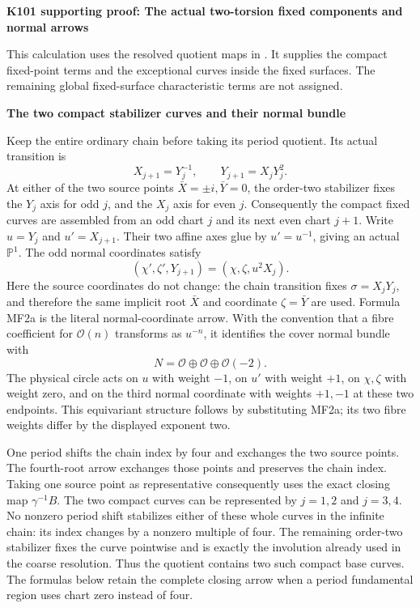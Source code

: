 \par\bigskip\noindent\textbf{K101 supporting proof: The actual two-torsion fixed components and normal arrows}\par\nobreak
This calculation uses the resolved quotient maps in
. It supplies the compact
fixed-point terms and the exceptional curves inside the fixed surfaces.
The remaining global fixed-surface characteristic terms are not assigned.

\par

\medskip\noindent\textbf{The two compact stabilizer curves and their normal bundle}

\par\nobreak

Keep the entire ordinary chain before taking its period quotient. Its
actual transition is
\[
 X_{j+1}=Y_j^{-1},\qquad Y_{j+1}=X_jY_j^2.
\]
At either of the two source points \(\bar X=\pm i,\bar Y=0\),
the order-two stabilizer fixes the \(Y_j\) axis for odd \(j\),
and the \(X_j\) axis for even \(j\). Consequently the compact
fixed curves are assembled from an odd chart \(j\) and its next
even chart \(j+1\). Write \(u=Y_j\) and \(u'=X_{j+1}\).
Their two affine axes glue by \(u'=u^{-1}\), giving an actual
\(\mathbb P^1\). The odd normal coordinates satisfy
\[
 (\chi',\zeta',Y_{j+1})=(\chi,\zeta,u^2X_j).
\tag{MF2a}
\]
Here the source coordinates do not change: the chain transition fixes
\(\sigma=X_jY_j\), and therefore the same implicit root \(\bar X\)
and coordinate \(\zeta=\bar Y\) are used. Formula MF2a is the
literal normal-coordinate arrow. With the convention that a fibre
coefficient for \(\mathcal O(n)\) transforms as \(u^{-n}\), it
identifies the cover normal bundle with
\[
 N=\mathcal O\oplus\mathcal O\oplus\mathcal O(-2).
\tag{MF2b}
\]
The physical circle acts on \(u\) with weight \(-1\), on \(u'\)
with weight \(+1\), on \(\chi,\zeta\) with weight zero, and on
the third normal coordinate with weights \(+1,-1\) at these two
endpoints. This equivariant structure follows by substituting MF2a;
its two fibre weights differ by the displayed exponent two.

One period shifts the chain index by four and exchanges the two source
points. The fourth-root arrow exchanges those points and preserves the
chain index. Taking one source point as representative consequently uses
the exact closing map \(\gamma^{-1}B\). The two compact curves can be
represented by \(j=1,2\) and \(j=3,4\). No nonzero period shift
stabilizes either of these whole curves in the infinite chain: its
index changes by a nonzero multiple of four. The remaining order-two
stabilizer fixes the curve pointwise and is exactly the involution already
used in the coarse resolution. Thus the quotient contains two such
compact base curves. The formulas below retain the complete closing
arrow when a period fundamental region uses chart zero instead of four.

